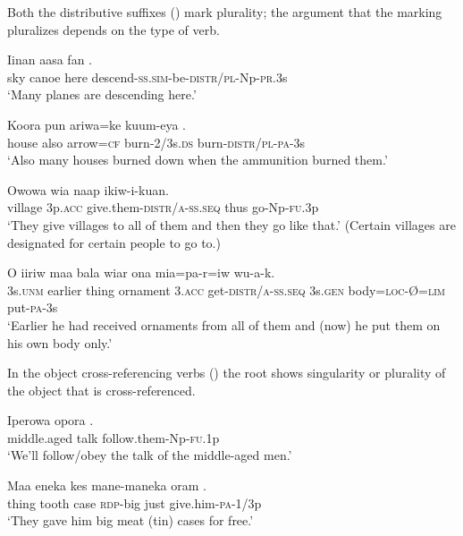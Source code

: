 Both the distributive suffixes () mark plurality; the argument that the marking pluralizes depends on the type of verb. 

\ea%
\label{ex:x1300}
\gll Iinan  aasa  fan  . \\
sky  canoe  here  descend-\textsc{ss}.\textsc{sim}-be-\textsc{distr}/\textsc{pl}-Np-\textsc{pr}.3s\\
\glt `Many planes are descending here.'
\z

\ea%
\label{ex:x1299}
\gll Koora  pun  ariwa=ke  kuum-eya  . \\
house  also  arrow=\textsc{cf}  burn-2/3s.\textsc{ds}  burn-\textsc{distr}/\textsc{pl}-\textsc{pa}-3s\\
\glt `Also many houses burned down when the ammunition burned them.'
\z

\ea%
\label{ex:x1301}
\gll Owowa  wia    naap  ikiw-i-kuan. \\
village  3p.\textsc{acc}  give.them-\textsc{distr}/\textsc{a}-\textsc{ss}.\textsc{seq}  thus  go-Np-\textsc{fu}.3p\\
\glt `They give villages to all of them and then they go like that.' (Certain villages are designated for certain people to go to.)
\z

\ea%
\label{ex:x1302}
\gll O  iiriw  maa  bala  wiar   ona  mia=pa-r=iw  wu-a-k.\\
3s.\textsc{unm}  earlier  thing  ornament  3.\textsc{acc}  get-\textsc{distr}/\textsc{a}-\textsc{ss}.\textsc{seq} 3s.\textsc{gen}  body=\textsc{loc}-{\O}=\textsc{lim}  put-\textsc{pa}-3s\\
\glt `Earlier he had received ornaments from all of them and (now) he put them on his own body only.'
\z

In the object cross-referencing verbs () the root shows singularity or plurality of the object that is cross-referenced.

\ea%
\label{ex:x1303}
\gll Iperowa  opora  . \\
middle.aged  talk  follow.them-Np-\textsc{fu}.1p\\
\glt `We'll follow/obey the talk of the middle-aged men.'
\z

\ea%
\label{ex:x1304}
\gll Maa  eneka  kes  mane-maneka  oram  . \\
thing  tooth  case  \textsc{rdp}-big  just  give.him-\textsc{pa}-1/3p\\
\glt `They gave him big meat (tin) cases for free.'
\z

